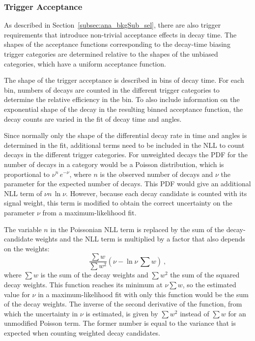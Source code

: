 \subsubsection{Trigger Acceptance}
As described in Section~\ref{subsec:ana_bkgSub_sel}, there are also trigger requirements that introduce non-trivial acceptance effects in
decay time. The shapes of the acceptance functions corresponding to the decay-time biasing trigger categories are determined relative to
the shapes of the unbiased categories, which have a uniform acceptance function.

The shape of the trigger acceptance is described in bins of decay time. For each bin, numbers of decays are counted in the different
trigger categories to determine the relative efficiency in the bin. To also include information on the exponential shape of the decay in
the resulting binned acceptance function, the decay counts are varied in the fit of decay time and angles.

Since normally only the shape of the differential decay rate in time and angles is determined in the fit, additional terms need to be
included in the NLL to count decays in the different trigger categories. For unweighted decays the PDF for the number of decays in a
category would be a Poisson distribution, which is proportional to $\nu^n\,e^{-\nu}$, where $n$ is the observed number of decays and $\nu$
the parameter for the expected number of decays. This PDF would give an additional NLL term of $\nu$\textminus$n\,\ln\nu$. However, because
each decay candidate is counted with its signal weight, this term is modified to obtain the correct uncertainty on the parameter $\nu$ from
a maximum-likelihood fit.

The variable $n$ in the Poissonian NLL term is replaced by the sum of the decay-candidate weights and the NLL term is multiplied by a
factor that also depends on the weights:
\begin{equation}
  \label{eq:weightPoisson}
  \frac{\sum w}{\sum w^2}\left( \nu - \ln\nu\,\sum w \right)\ ,
\end{equation}
where $\sum w$ is the sum of the decay weights and $\sum w^2$ the sum of the squared decay weights. This function reaches its minimum at
$\nu$\texteq$\sum w$, so the estimated value for $\nu$ in a maximum-likelihood fit with only this function would be the sum of the decay
weights. The inverse of the second derivative of the function, from which the uncertainty in $\nu$ is estimated, is given by $\sum w^2$
instead of $\sum w$ for an unmodified Poisson term. The former number is equal to the variance that is expected when counting weighted
decay candidates.

